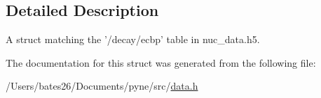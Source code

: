 \subsection{Detailed Description}
A struct matching the '/decay/ecbp' table in nuc\+\_\+data.\+h5. 

The documentation for this struct was generated from the following file\+:\begin{DoxyCompactItemize}
\item 
/\+Users/bates26/\+Documents/pyne/src/\hyperlink{data_8h}{data.\+h}\end{DoxyCompactItemize}
